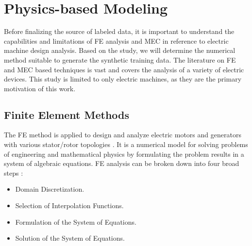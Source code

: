 \section{Physics-based Modeling}

Before finalizing the source of labeled data, it is important to understand the capabilities and limitations of FE analysis and MEC in reference to electric machine design analysis. Based on the study, we will determine the numerical method suitable to generate the synthetic training data. The literature on FE and MEC based techniques is vast and covers the analysis of a variety of electric devices. This study is limited to only electric machines, as they are the primary motivation of this work.

\subsection{Finite Element Methods}

The FE method is applied to design and analyze electric motors and generators with various stator/rotor topologies \parencite{mousavi2015design, rosu2017multiphysics}.
It is a numerical model for solving problems of engineering and mathematical physics by formulating the problem results in a system of algebraic equations. FE analysis can be broken down into four broad steps \parencite{jin2015finite, salon1995finite}:
\begin{itemize}
    \item Domain Discretization.
    \item Selection of Interpolation Functions.
    \item Formulation of the System of Equations.
    \item Solution of the System of Equations.
\end{itemize} 

